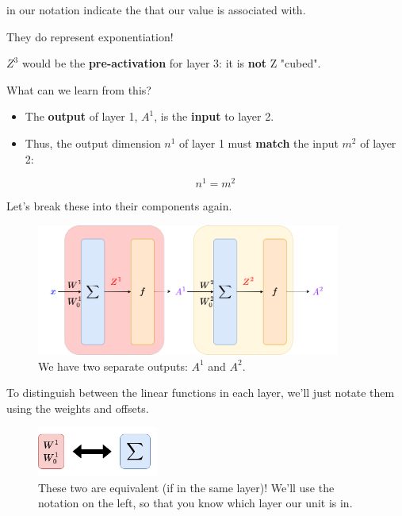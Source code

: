         \begin{clarification}
             in our notation indicate the  that our value is associated with.
            
            They do  represent exponentiation! 
        \end{clarification}
        
        \miniex $Z^3$ would be the \textbf{pre-activation} for layer 3: it is \textbf{not} Z "cubed".
        
        What can we learn from this?
        
        \begin{itemize}
            \item The \textbf{output} of layer 1, $A^1$, is the \textbf{input} to layer 2.
            
            \item Thus, the output dimension $n^1$ of layer 1 must \textbf{match} the input $m^2$ of layer 2: 
            
            \begin{equation}
                n^1=m^2
            \end{equation}
        \end{itemize}
        
        Let's break these into their components again.
        
        \begin{figure}[H]
            \centering
            \includegraphics[width=100mm,scale=0.4]{images/nn_images/two_layers_internal.png}
            \caption*{We have two separate outputs: $A^1$ and $A^2$.}
        \end{figure}
        
        To distinguish between the linear functions in each layer, we'll just notate them using the weights and offsets.
        
        \begin{figure}[H]
            \centering
            \includegraphics[width=40mm,scale=0.4]{images/nn_images/linear_module_representation.png}
            \caption*{These two are equivalent (if in the same layer)! We'll use the notation on the left, so that you know which layer our unit is in.}
        \end{figure}
        
